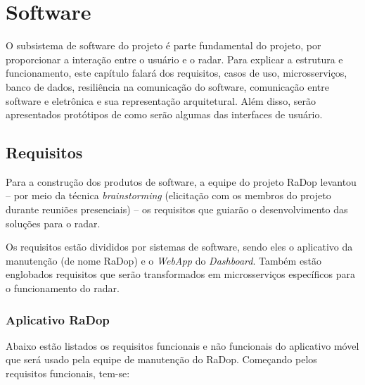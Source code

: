 \chapter{Software}

O subsistema de software do projeto é parte fundamental do projeto, por proporcionar a interação entre o usuário e o radar. Para explicar a estrutura e funcionamento, este capítulo falará dos requisitos, casos de uso, microsserviços, banco de dados, resiliência na comunicação do software, comunicação entre software e eletrônica e sua representação arquitetural. Além disso, serão apresentados protótipos de como serão algumas das interfaces de usuário.

\section{Requisitos}

Para a construção dos produtos de software, a equipe do projeto RaDop levantou -- por meio da técnica \textit{brainstorming} (elicitação com os membros do projeto durante reuniões presenciais) -- os requisitos que guiarão o desenvolvimento das soluções para o radar.

Os requisitos estão divididos por sistemas de software, sendo eles o aplicativo da manutenção (de nome RaDop) e o \textit{WebApp} do \textit{Dashboard}. Também estão englobados requisitos que serão transformados em microsserviços específicos para o funcionamento do radar.

\subsection{Aplicativo RaDop}

Abaixo estão listados os requisitos funcionais e não funcionais do aplicativo móvel que será usado pela equipe de manutenção do RaDop. Começando pelos requisitos funcionais, tem-se:

